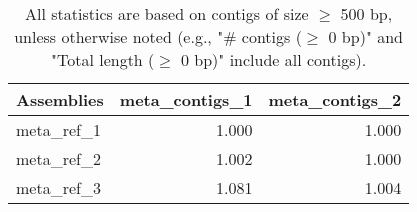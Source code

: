\documentclass[12pt,a4paper]{article}
\begin{document}
\begin{table}[ht]
\begin{center}
\caption{All statistics are based on contigs of size $\geq$ 500 bp, unless otherwise noted (e.g., "\# contigs ($\geq$ 0 bp)" and "Total length ($\geq$ 0 bp)" include all contigs).}
\begin{tabular}{|l*{2}{|r}|}
\hline
Assemblies & meta\_contigs\_1 & meta\_contigs\_2 \\ \hline
meta\_ref\_1 & 1.000 & 1.000 \\ \hline
meta\_ref\_2 & 1.002 & 1.000 \\ \hline
meta\_ref\_3 & 1.081 & 1.004 \\ \hline
\end{tabular}
\end{center}
\end{table}
\end{document}
